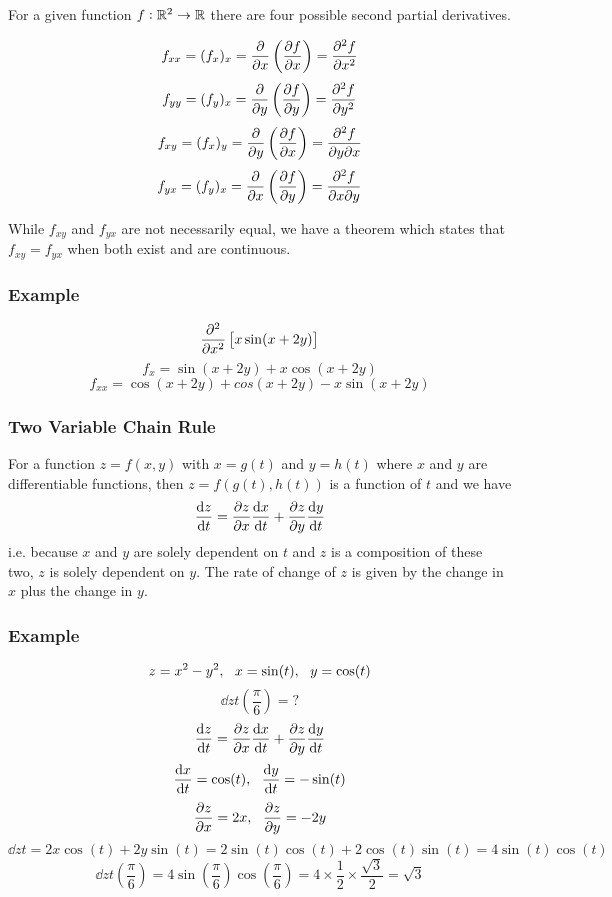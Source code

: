 \documentclass[12pt]{report}
\begin{document}
\begin{flushleft}
For a given function \(f : \mathbb{R}^2 \rightarrow \mathbb{R}\) there are four possible second
partial derivatives.

\[f_{xx} = (f_x)_x = \frac{\partial}{\partial x}\left(\frac{\partial f}{\partial x}\right) = \frac{\partial^2f}{\partial x^2}\]
\[f_{yy} = (f_y)_x = \frac{\partial}{\partial y}\left(\frac{\partial f}{\partial y}\right) = \frac{\partial^2f}{\partial y^2}\]
\[f_{xy} = (f_x)_y = \frac{\partial}{\partial y}\left(\frac{\partial f}{\partial x}\right)
= \frac{\partial^2f}{\partial y\partial x}\]
\[f_{yx} = (f_y)_x = \frac{\partial}{\partial x}\left(\frac{\partial f}{\partial y}\right)
= \frac{\partial^2f}{\partial x\partial y}\]

While \(f_{xy}\) and \(f_{yx}\) are not necessarily equal, we have a theorem
which states that \(f_{xy} = f_{yx}\) when both exist and are continuous.

\subsubsection*{Example}

\[\frac{\partial^2}{\partial x^2}\left[x\sin(x + 2y)\right]\]
\[f_x = \sin(x + 2y) + x\cos(x + 2y)\]
\[f_{xx} = \cos(x + 2y) + cos(x + 2y) - x\sin(x + 2y)\]

\subsubsection*{Two Variable Chain Rule}

For a function \(z = f(x, y)\) with \(x = g(t)\) and \(y = h(t)\) where \(x\)
and \(y\) are differentiable functions, then \(z = f(g(t), h(t))\) is a
function of \(t\) and we have
\[\frac{\mathrm{d}z}{\mathrm{d}t} = \frac{\partial z}{\partial x}\frac{\mathrm{d}x}{\mathrm{d}t} + \frac{\partial z}{\partial y}\frac{\mathrm{d}y}{\mathrm{d}t}\]
i.e. because \(x\) and \(y\) are solely dependent on \(t\) and \(z\) is a
composition of these two, \(z\) is solely dependent on \(y\). The rate of
change of \(z\) is given by the change in \(x\) plus the change in \(y\).

\subsubsection*{Example}

\[z = x^2 - y^2, \:\:\: x = \sin(t), \:\:\: y = \cos(t)\]
\[\dd{z}{t}\left(\frac{\pi}{6}\right) = ?\]
\[\frac{\mathrm{d}z}{\mathrm{d}t} = \frac{\partial z}{\partial x}\frac{\mathrm{d}x}{\mathrm{d}t} + \frac{\partial z}{\partial y}\frac{\mathrm{d}y}{\mathrm{d}t}\]
\[\frac{\mathrm{d}x}{\mathrm{d}t} = \cos(t), \:\:\: \frac{\mathrm{d}y}{\mathrm{d}t} = -\sin(t)\]
\[\frac{\partial z}{\partial x} = 2x, \:\:\: \frac{\partial z}{\partial y} = -2y\]
\[\dd{z}{t} = 2x\cos(t) + 2y\sin(t) = 2\sin(t)\cos(t) + 2\cos(t)\sin(t)
= 4\sin(t)\cos(t)\]
\[\dd{z}{t}\left(\frac{\pi}{6}\right) =
4\sin\left(\frac{\pi}{6}\right)\cos\left(\frac{\pi}{6}\right)
= 4\times\frac{1}{2}\times\frac{\sqrt{3}}{2} = \sqrt{3}\]


\end{flushleft}
\end{document}
